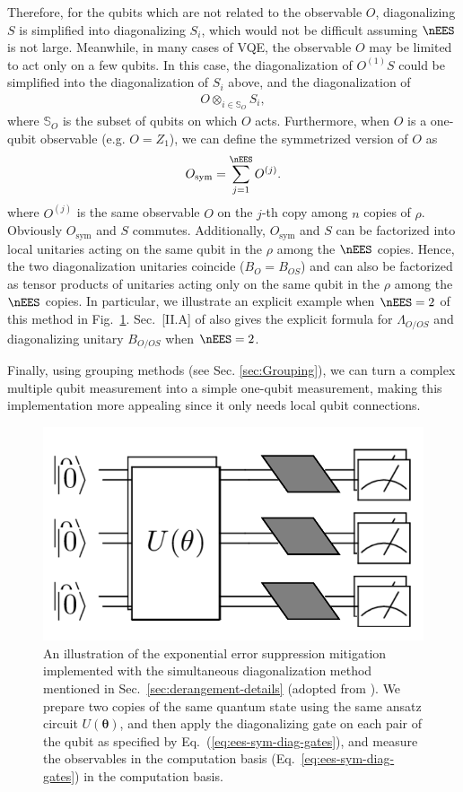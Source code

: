 Therefore, for the qubits which are not related to the observable $O$, diagonalizing $S$ is simplified
into diagonalizing $S_i$, which would not be difficult assuming $\nEES$ is not large.
Meanwhile, in many cases of VQE, the observable $O$ may be limited to act only on a few qubits.
In this case, the diagonalization of $O^{(1)}S$ could be simplified into the diagonalization of $S_i$
above, and the diagonalization of
\begin{align}
    O \otimes_{i\in \mathbb{S}_O} S_i,
\end{align}
where $\mathbb{S}_O$ is the subset of qubits on which $O$ acts.
Furthermore, when $O$ is a one-qubit observable (e.g. $O=Z_1$), we can define the symmetrized
version of $O$ as
\begin{equation}
    O_{\mathrm{sym}} = \sum_{j=1}^\nEES O^{(j)}.
\end{equation}
where $O^{(j)}$ is the same observable $O$ on the $j$-th copy among $n$ copies of $\rho$.
Obviously $O_{\mathrm{sym}}$ and $S$ commutes. Additionally, $O_{\mathrm{sym}}$ and $S$
can be factorized into local unitaries acting on the same qubit in the $\rho$ among the $\nEES$ copies.
Hence, the two diagonalization unitaries coincide ($B_O = B_{OS}$) and can also be factorized
as tensor products of unitaries acting only on the same qubit in the $\rho$ among the $\nEES$ copies.
In particular,
we illustrate an explicit example when $\nEES=2$ of this method in Fig.~\ref{fig:ees-sym-diag}. Sec.~[II.A] of \citet{hugginsVirtualDistillationQuantum2021} also gives the explicit formula for $\Lambda_{O/OS}$ and diagonalizing
unitary $B_{O/OS}$ when $\nEES=2$.

Finally, using grouping methods (see Sec. \ref{sec:Grouping}), we can turn a complex multiple qubit measurement into a simple one-qubit measurement, making this implementation more appealing since it only needs
local qubit connections.

\begin{figure}[ht]
    \centering
    \includegraphics[width=0.50\linewidth]{figs/errormit/ees-sym-diag.pdf}
    \caption{An illustration of the exponential error suppression mitigation implemented with the simultaneous diagonalization method mentioned in Sec.~\ref{sec:derangement-details}
    (adopted from \citet{hugginsVirtualDistillationQuantum2021}).
    We prepare two copies of the same quantum state using the same ansatz circuit $U(\boldsymbol{\theta})$,
    and then apply the diagonalizing gate on each pair of the qubit as specified by Eq.~(\ref{eq:ees-sym-diag-gates}),
    and measure the observables in the computation basis (Eq.~\ref{eq:ees-sym-diag-gates}) in the computation basis.
}
    \label{fig:ees-sym-diag}
\end{figure}

